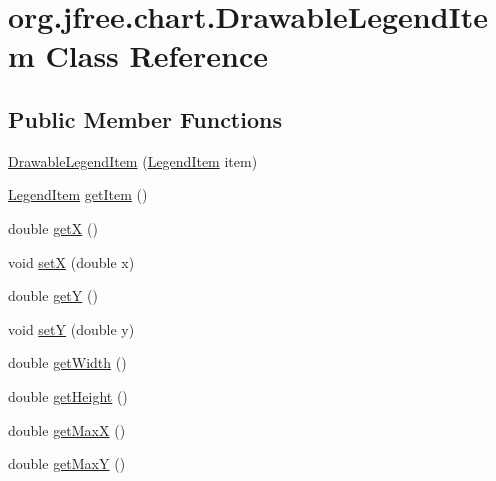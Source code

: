 \hypertarget{classorg_1_1jfree_1_1chart_1_1_drawable_legend_item}{}\section{org.\+jfree.\+chart.\+Drawable\+Legend\+Item Class Reference}
\label{classorg_1_1jfree_1_1chart_1_1_drawable_legend_item}
\subsection*{Public Member Functions}
\begin{DoxyCompactItemize}
\item 
\mbox{\hyperlink{classorg_1_1jfree_1_1chart_1_1_drawable_legend_item_a1bacedfcd4ffdbb2e044dfb3d1894f9f}{Drawable\+Legend\+Item}} (\mbox{\hyperlink{classorg_1_1jfree_1_1chart_1_1_legend_item}{Legend\+Item}} item)
\item 
\mbox{\hyperlink{classorg_1_1jfree_1_1chart_1_1_legend_item}{Legend\+Item}} \mbox{\hyperlink{classorg_1_1jfree_1_1chart_1_1_drawable_legend_item_acadbd9754ae9e2acb59ec81c68f55872}{get\+Item}} ()
\item 
double \mbox{\hyperlink{classorg_1_1jfree_1_1chart_1_1_drawable_legend_item_a79389bedf55b57549f11fc5078d1a04f}{getX}} ()
\item 
void \mbox{\hyperlink{classorg_1_1jfree_1_1chart_1_1_drawable_legend_item_a5f70a05cfb39b613ddfc815c2f2d2030}{setX}} (double x)
\item 
double \mbox{\hyperlink{classorg_1_1jfree_1_1chart_1_1_drawable_legend_item_aac2b571271ba6406831352e5a324b900}{getY}} ()
\item 
void \mbox{\hyperlink{classorg_1_1jfree_1_1chart_1_1_drawable_legend_item_a9dffae92b78f8994289b2ad61b76e6de}{setY}} (double y)
\item 
double \mbox{\hyperlink{classorg_1_1jfree_1_1chart_1_1_drawable_legend_item_a8ba5627ef06be6c4ac0548ff18880377}{get\+Width}} ()
\item 
double \mbox{\hyperlink{classorg_1_1jfree_1_1chart_1_1_drawable_legend_item_afde5ae5e89d64e488c21cf091cb66c9b}{get\+Height}} ()
\item 
double \mbox{\hyperlink{classorg_1_1jfree_1_1chart_1_1_drawable_legend_item_a1193b443f8d6ca37987f78789338b669}{get\+MaxX}} ()
\item 
double \mbox{\hyperlink{classorg_1_1jfree_1_1chart_1_1_drawable_legend_item_a3f5ce6a3244510f1df8f7762e64b6f41}{get\+MaxY}} ()

\end{DoxyCompactItemize}
